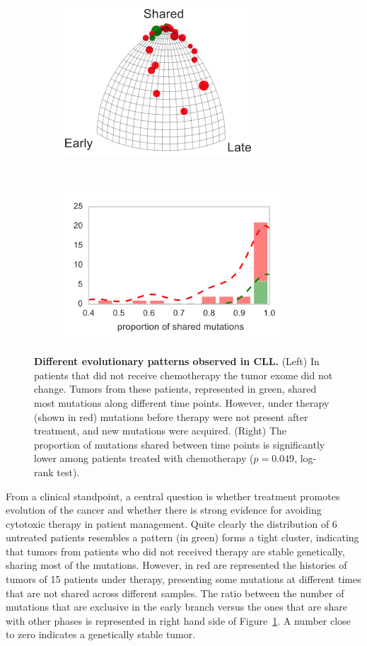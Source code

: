 \documentclass[a4paper,11pt]{article}
\begin{document}
\begin{figure}
    \begin{subfigure}{0.5\linewidth}
    \centering
    \includegraphics[height=2.2in]{../figures/CLL_triplet.png}
    \end{subfigure}
    ~
    \begin{subfigure}{0.5\linewidth}
    \centering
    \includegraphics[height=2.2in]{../figures/CLL_histogram.pdf}
    \end{subfigure}

    \caption{{\bf Different evolutionary patterns observed in CLL.} (Left) In patients that did not receive chemotherapy the tumor exome did not change. Tumors from these patients, represented in green, shared most mutations along different time points. However, under therapy (shown in red) mutations before therapy were not present after treatment, and new mutations were acquired. (Right) The proportion of mutations shared between time points is significantly lower among patients treated with chemotherapy ($p = 0.049$, log-rank test).}
    \label{fig:chemoCLL}
\end{figure}

From a clinical standpoint, a central question is whether treatment promotes evolution of the cancer and whether there is strong evidence for avoiding cytotoxic therapy in patient management.
Quite clearly the distribution of 6 untreated patients resembles a pattern (in green) forms a tight cluster, indicating that tumors from patients who did not received therapy are stable genetically, sharing most of the mutations.
However, in red are represented the histories of tumors of 15 patients under therapy, presenting some mutations at different times that are not shared across different samples.
The ratio between the number of mutations that are exclusive in the early branch versus the ones that are share with other phases is represented in right hand side of Figure~\ref{fig:chemoCLL}.
A number close to zero indicates a genetically stable tumor.
\end{document}
